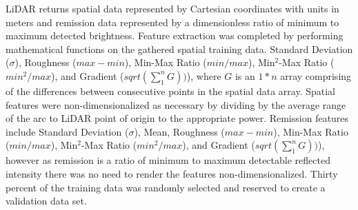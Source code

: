 \documentclass[journal,onecolumn]{IEEEtran}
\begin{document}
	
			{LiDAR returns spatial data represented by Cartesian coordinates with units in meters and remission data represented by a dimensionless ratio of minimum to maximum detected brightness. Feature extraction was completed by performing mathematical functions on the gathered spatial training data. Standard Deviation ($\sigma$), Roughness ($max - min$), Min-Max Ratio ($min / max$), Min$^{2}$-Max Ratio ($min^2 / max$), and Gradient ($sqrt(\sum_{1}^{n} G))$), where $G$ is an $1*n$ array comprising of the differences between consecutive points in the spatial data array. Spatial features were non-dimensionalized as necessary by dividing by the average range of the arc to LiDAR point of origin to the appropriate power. Remission features include Standard Deviation ($\sigma$), Mean, Roughness ($max - min$), Min-Max Ratio ($min / max$), Min$^{2}$-Max Ratio ($min^2 / max$), and Gradient ($sqrt(\sum_{1}^{n} G))$), however as remission is a ratio of minimum to maximum detectable reflected intensity there was no need to render the features non-dimensionalized. Thirty percent of the training data was randomly selected and reserved to create a validation data set.} 
	
	
\end{document}
